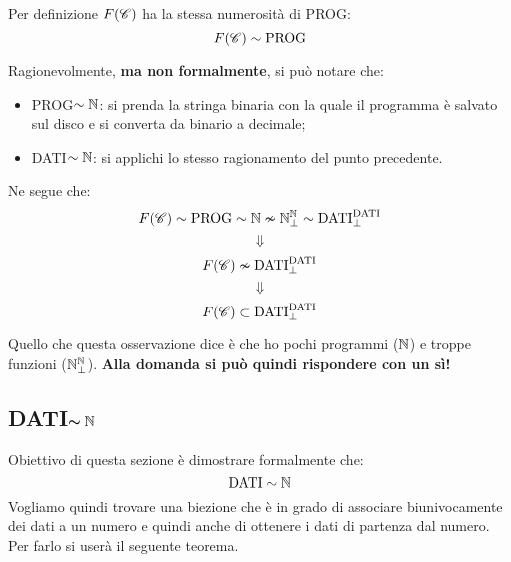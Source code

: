 Per definizione $F(\mathscr{C})$ ha la stessa numerosità di PROG:
$$ F(\mathscr{C}) \sim \text{PROG} $$

Ragionevolmente, \textbf{ma non formalmente}, si può notare che:
\begin{itemize}
    \item PROG$\sim\mathbb{N}$: si prenda la stringa binaria con la quale il programma è
        salvato sul disco e si converta da binario a decimale;
    \item DATI$\sim\mathbb{N}$: si applichi lo stesso ragionamento del punto precedente.
\end{itemize}
Ne segue che:
$$ F(\mathscr{C}) \sim \text{PROG} \sim \mathbb{N} \nsim\mathbb{N}^{\mathbb{N}}_\perp\sim \text{DATI}^\text{DATI}_\perp$$
$$ \Downarrow $$
$$ F(\mathscr{C}) \nsim \text{DATI}^\text{DATI}_\perp $$
$$ \Downarrow $$
$$ F(\mathscr{C}) \subset \text{DATI}^\text{DATI}_\perp $$

Quello che questa osservazione dice è che ho pochi programmi ($\mathbb{N}$) e troppe
funzioni ($\mathbb{N}^{\mathbb{N}}_\perp$).
\textbf{Alla domanda  si può quindi 
rispondere con un sì!}

\subsection{\texorpdfstring{DATI$\bm{\sim\mathbb{N}}$}{DATI~N}}
Obiettivo di questa sezione è dimostrare formalmente che:
$$ \text{DATI} \sim \mathbb{N} $$
Vogliamo quindi trovare una biezione che è in grado di associare biunivocamente
dei dati a un numero e quindi anche di ottenere i dati di partenza dal
numero. Per farlo si userà il seguente teorema.

